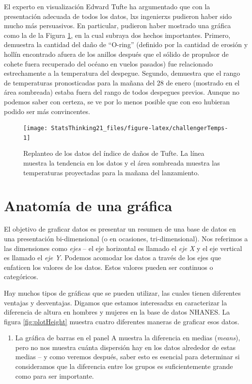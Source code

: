 \documentclass[
  12pt,
]{book}
\providecommand{\tightlist}{%
  \setlength{\itemsep}{0pt}\setlength{\parskip}{0pt}}
\begin{document}
El experto en visualización Edward Tufte ha argumentado que con la presentación adecuada de todos los datos, lxs ingenierxs pudieron haber sido mucho más persuasivos. En particular, pudieron haber mostrado una gráfica como la de la Figura \ref{fig:challengerTemps}, en la cual subraya dos hechos importantes. Primero, demuestra la cantidad del daño de ``O-ring'' (definido por la cantidad de erosión y hollín encontrado afuera de los anillos después que el sólido de propulsor de cohete fuera recuperado del océano en vuelos pasados) fue relacionado estrechamente a la temperatura del despegue. Segundo, demuestra que el rango de temperaturas pronosticadas para la mañana del 28 de enero (mostrado en el área sombreada) estaba fuera del rango de todos despegues previos. Aunque no podemos saber con certeza, se ve por lo menos posible que con eso hubieran podido ser más convincentes.

\begin{figure}
\texttt{[image: StatsThinking21\_files/figure-latex/challengerTemps-1]} \caption{Replanteo de los datos del índice de daños de Tufte. La línea muestra la tendencia en los datos y el área sombreada muestra las temperaturas proyectadas para la mañana del lanzamiento.}\label{fig:challengerTemps}
\end{figure}

\hypertarget{anatomuxeda-de-una-gruxe1fica}{%
\section{Anatomía de una gráfica}\label{anatomuxeda-de-una-gruxe1fica}}

El objetivo de graficar datos es presentar un resumen de una base de datos en una presentación bi-dimensional (o en ocasiones, tri-dimensional). Nos referimos a las dimensiones como \emph{ejes} -- el eje horizontal es llamado el \emph{eje X} y el eje vertical es llamado el \emph{eje Y}. Podemos acomodar los datos a través de los ejes que enfaticen los valores de los datos. Estos valores pueden ser continuos o categóricos.

Hay muchos tipos de gráficas que se pueden utilizar, las cuales tienen diferentes ventajas y desventajas. Digamos que estamos interesadxs en caracterizar la diferencia de altura en hombres y mujeres en la base de datos NHANES. La figura \ref{fig:plotHeight} muestra cuatro diferentes maneras de graficar esos datos.

\begin{enumerate}
\def\labelenumi{\arabic{enumi}.}
\tightlist
\item
  La gráfica de barras en el panel A muestra la diferencia en medias (\emph{means}), pero no nos muestra cuánta dispersión hay en los datos alrededor de estas medias -- y como veremos después, saber esto es esencial para determinar si consideramos que la diferencia entre los grupos es suficientemente grande como para ser importante.
\end{enumerate}
\end{document}
